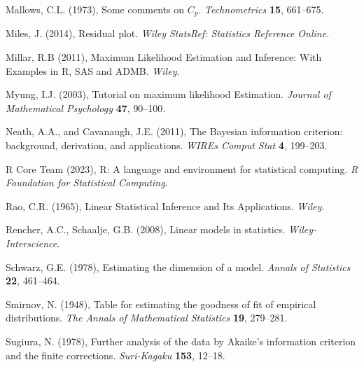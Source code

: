\phantom{a}

\rff Mallows, C.L. (1973),
      Some comments on $C_p$.
      {\it Technometrics}
      {\bf 15}, {661--675}.

\phantom{a}

\rff Miles, J. (2014),
      Residual plot.
      {\it Wiley StatsRef: Statistics Reference Online}.      

\phantom{a}

\rff Millar, R.B (2011),
      Maximum Likelihood Estimation and Inference: With Examples in R, SAS and ADMB.
      {\it Wiley}.      

\phantom{a}

\rff Myung, I.J. (2003),
      Tutorial on maximum likelihood Estimation.
      {\it Journal of Mathematical Psychology}
      {\bf 47}, {90--100}.      

\phantom{a}

\rff Neath, A.A., and Cavanaugh, J.E. (2011),
      The Bayesian information criterion: background, derivation, and applications.
      {\it WIREs Comput Stat}
      {\bf 4}, {199--203}.
      
\phantom{a}

\rff R Core Team (2023),
      R: A language and environment for statistical computing.
      {\it R Foundation for Statistical Computing}.


\phantom{a}

\rff Rao, C.R. (1965),
      Linear Statistical Inference and Its Applications.
      {\it Wiley}.

\phantom{a}

\rff Rencher, A.C., Schaalje, G.B. (2008),
      Linear models in statistics.
      {\it Wiley-Interscience}.

\phantom{a}

\rff Schwarz, G.E. (1978),
      Estimating the dimension of a model.
      {\it Annals of Statistics}
      {\bf 22}, {461--464}.

\phantom{a}

\rff Smirnov, N. (1948),
    Table for estimating the goodness of fit of empirical distributions.
    {\it The Annals of Mathematical Statistics}
    {\bf 19}, {279--281}.

\phantom{a}

\rff Sugiura, N. (1978),
      Further analysis of the data by Akaike's information criterion and the finite corrections.
      {\it Suri-Kagaku}
      {\bf 153}, {12--18}.

\phantom{a}

